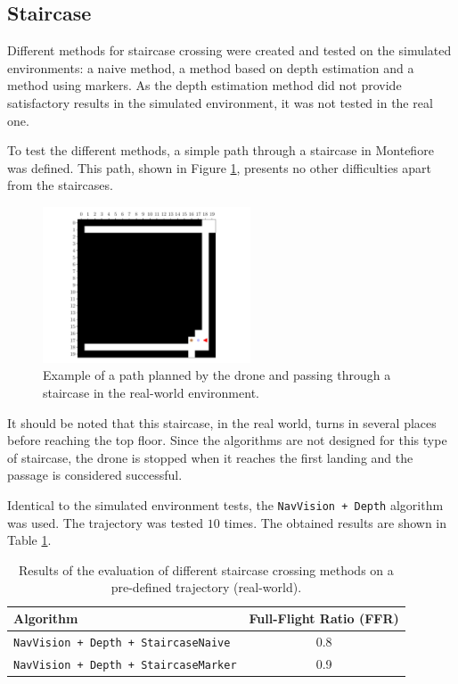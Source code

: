 \subsection{Staircase}

Different methods for staircase crossing were created and tested on the simulated environments: a naive method, a method based on depth estimation and a method using markers. As the depth estimation method did not provide satisfactory results in the simulated environment, it was not tested in the real one.

To test the different methods, a simple path through a staircase in Montefiore was defined. This path, shown in Figure \ref{fig:07.advanced.staircase.path}, presents no other difficulties apart from the staircases.

\begin{figure}[H]
    \centering
    \includegraphics[width=0.55\textwidth]{resources/pdf/07/staircase/path.pdf}
    \caption{Example of a path planned by the drone and passing through a staircase in the real-world environment.}
    \label{fig:07.advanced.staircase.path}
\end{figure}

It should be noted that this staircase, in the real world, turns in several places before reaching the top floor. Since the algorithms are not designed for this type of staircase, the drone is stopped when it reaches the first landing and the passage is considered successful.

Identical to the simulated environment tests, the \texttt{NavVision + Depth} algorithm was used. The trajectory was tested $\num{10}$ times. The obtained results are shown in Table \ref{tab:07.evaluation.staircase.results}.

\begin{table}[H]
    \centering
    \begin{tabular}{|l|c|}
        \hline
        \textbf{Algorithm} & \textbf{Full-Flight Ratio} (FFR) \\ \hline
        \hline
        \texttt{NavVision + Depth + StaircaseNaive} & \num{0.8} \\ \hline
        \texttt{NavVision + Depth + StaircaseMarker} & \num{0.9} \\ \hline
    \end{tabular}
    \caption{Results of the evaluation of different staircase crossing methods on a pre-defined trajectory (real-world).}
    \label{tab:07.evaluation.staircase.results}
\end{table}

